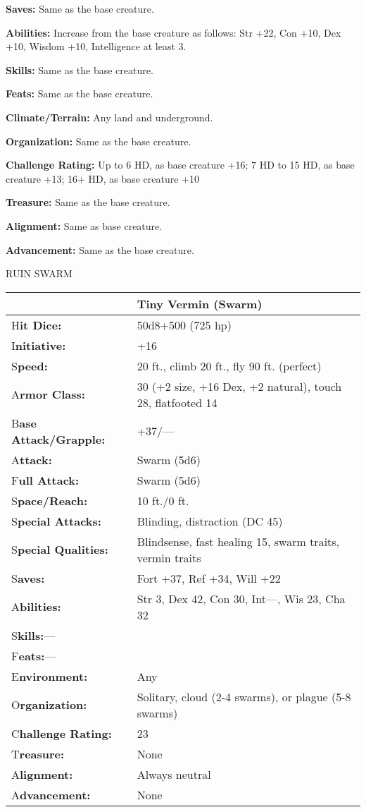 \documentclass{article}
\begin{document}
{\textbf{Saves:} Same as the base creature. 

\textbf{Abilities:} Increase from the base creature as follows: Str +22, Con +10, 
Dex +10, Wisdom +10, Intelligence at least 3. 

\textbf{Skills:} Same as the base creature. 

\textbf{Feats: }Same as the base creature. 

\textbf{Climate/Terrain:} Any land and underground.

\textbf{Organization:} Same as the base creature. 

\textbf{Challenge Rating:} Up to 6 HD, as base creature +16; 7 HD to 15 HD, as 
base creature +13; 16+ HD, as base creature +10 

\textbf{Treasure: }Same as the base creature. 

\textbf{Alignment:} Same as base creature. 

\textbf{Advancement:} Same as the base creature. 

\vspace{12pt}
{\LARGE{}RUIN SWARM}

\begin{tabular}{|>{\raggedright}p{91pt}|>{\raggedright}p{228pt}|}
\hline
  & Tiny Vermin (Swarm)\tabularnewline
\hline
H\textbf{it Dice:} & 50d8+500 (725 hp)\tabularnewline
\hline
I\textbf{nitiative:} & +16\tabularnewline
\hline
S\textbf{peed:} & 20 ft., climb 20 ft., fly 90 ft. (perfect)\tabularnewline
\hline
A\textbf{rmor Class:} & 30 (+2 size, +16 Dex, +2 natural), touch 28, flatfooted 
14\tabularnewline
\hline
B\textbf{ase Attack/Grapple:} & +37/---\tabularnewline
\hline
A\textbf{ttack:} & Swarm (5d6)\tabularnewline
\hline
F\textbf{ull Attack:} & Swarm (5d6)\tabularnewline
\hline
S\textbf{pace/Reach:} & 10 ft./0 ft.\tabularnewline
\hline
S\textbf{pecial Attacks:} & Blinding, distraction (DC 45)\tabularnewline
\hline
S\textbf{pecial Qualities:} & Blindsense, fast healing 15, swarm traits, vermin 
traits\tabularnewline
\hline
S\textbf{aves:} & Fort +37, Ref +34, Will +22\tabularnewline
\hline
A\textbf{bilities:} & Str 3, Dex 42, Con 30, Int---, Wis 23, Cha 32\tabularnewline
\hline
S\textbf{kills:}--- & \tabularnewline
\hline
F\textbf{eats:}--- & \tabularnewline
\hline
E\textbf{nvironment:} & Any\tabularnewline
\hline
O\textbf{rganization:} & Solitary, cloud (2-4 swarms), or plague (5-8 swarms)\tabularnewline
\hline
C\textbf{hallenge Rating:} & 23\tabularnewline
\hline
T\textbf{reasure:} & None\tabularnewline
\hline
A\textbf{lignment:} & Always neutral\tabularnewline
\hline
A\textbf{dvancement:} & None\tabularnewline
\hline
\end{tabular}

}
\end{document}
